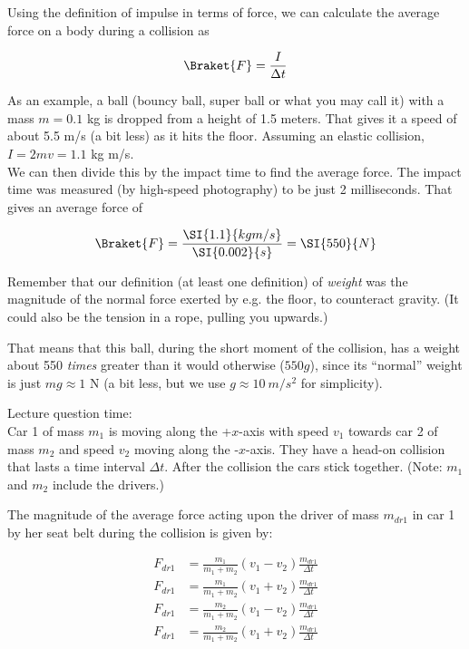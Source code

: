 Using the definition of impulse in terms of force, we can calculate the average force on a body during a collision as

\begin{equation}
\Braket{F} = \frac{I}{\Delta t}
\end{equation}

As an example, a ball (bouncy ball, super ball or what you may call it) with a mass $m = 0.1$ kg is dropped from a height of 1.5 meters. That gives it a speed of about 5.5 m/s (a bit less) as it hits the floor. Assuming an elastic collision, $I = 2 m v = 1.1$ kg m/s.\\
We can then divide this by the impact time to find the average force. The impact time was measured (by high-speed photography) to be just 2 milliseconds. That gives an average force of

\begin{equation}
\Braket{F} = \frac{\SI{1.1}{kg m/s}}{\SI{0.002}{s}} = \SI{550}{N}
\end{equation}

Remember that our definition (at least one definition) of \emph{weight} was the magnitude of the normal force exerted by e.g. the floor, to counteract gravity. (It could also be the tension in a rope, pulling you upwards.)

That means that this ball, during the short moment of the collision, has a weight about 550 \emph{times} greater than it would otherwise ($550 g$), since its ``normal'' weight is just $m g \approx 1$ N (a bit less, but we use $g \approx \SI{10}{m/s^2}$ for simplicity).

Lecture question time:\\
Car 1 of mass $m_1$ is moving along the +$x$-axis with speed $v_1$ towards car 2 of mass $m_2$ and speed $v_2$ moving along the -$x$-axis. They have a head-on collision that lasts a time interval $\Delta t$. After the collision the cars stick together. (Note: $m_1$ and $m_2$ include the drivers.)

The magnitude of the average force acting upon the driver of mass $m_{dr1}$ in car 1 by her seat belt during the collision is given by:

\begin{align*}
F_{dr1} &= \frac{m_1}{m_1 + m_2} (v_1 - v_2) \frac{m_{dr1}}{\Delta t}\\
F_{dr1} &= \frac{m_1}{m_1 + m_2} (v_1 + v_2) \frac{m_{dr1}}{\Delta t}\\
F_{dr1} &= \frac{m_2}{m_1 + m_2} (v_1 - v_2) \frac{m_{dr1}}{\Delta t}\\
F_{dr1} &= \frac{m_2}{m_1 + m_2} (v_1 + v_2) \frac{m_{dr1}}{\Delta t}
\end{align*}


